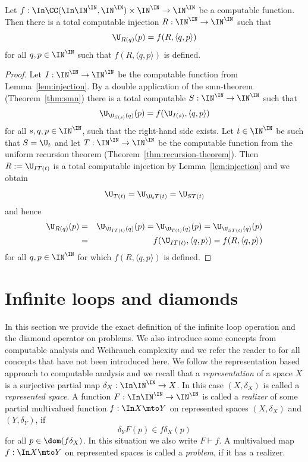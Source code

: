 \begin{thm}
\label{thm:injective-recursion}
Let $f:\In\CC(\In\IN^\IN,\IN^\IN)\times\IN^\IN\to\IN^\IN$ be a computable function.
Then there is a total computable injection $R:\IN^\IN\to\IN^\IN$ such that
\[\U_{R(q)}(p)=f(R,\langle q,p\rangle)\]
for all $q,p\in\IN^\IN$ such that $f(R,\langle q,p\rangle)$ is defined.
\end{thm}
\begin{proof}
Let $I:\IN^\IN\to\IN^\IN$ be the computable function from Lemma~\ref{lem:injection}.
By a double application of the smn-theorem (Theorem~\ref{thm:smn}) there is a total computable ${S:\IN^\IN\to\IN^\IN}$ such that
\[\U_{\U_{S(s)}(q)}(p)=f(\U_{I(s)},\langle q,p\rangle)\]
for all $s,q,p\in\IN^\IN$, such that the right-hand side exists. 
Let $t\in\IN^\IN$ be such that $S=\U_t$ and let $T:\IN^\IN\to\IN^\IN$ be the computable
function from the uniform recursion theorem (Theorem~\ref{thm:recursion-theorem}).
Then $R:=\U_{IT(t)}$ is a total computable injection by Lemma~\ref{lem:injection} and we obtain
\[\U_{T(t)}=\U_{\U_tT(t)}=\U_{ST(t)}\]
and hence
\begin{eqnarray*}
\U_{R(q)}(p) 
&=&\U_{\U_{IT(t)}(q)}(p)=\U_{\U_{T(t)}(q)}(p)=\U_{\U_{ST(t)}(q)}(p)\\
&=&f(\U_{IT(t)},\langle q,p\rangle)=f(R,\langle q,p\rangle)
\end{eqnarray*}
for all $q,p\in\IN^\IN$ for which $f(R,\langle q,p\rangle)$ is defined.
\end{proof}


\section{Infinite loops and diamonds}
\label{sec:definitions}

In this section we provide the exact definition of the infinite loop operation and the diamond operator on problems. 
We also introduce some concepts from computable analysis and Weihrauch complexity
and we refer the reader to \cite{BH21,Wei00} for all concepts that have not been introduced here.
We follow the representation based approach to computable analysis and we recall
that a {\em representation} of a space $X$ is a surjective partial map $\delta_X:\In\IN^\IN\to X$.
In this case $(X,\delta_X)$ is called a {\em represented space}.
A function $F:\In\IN^\IN\to\IN^\IN$
is called a {\em realizer} of some partial multivalued function $f:\In X\mto Y$ on represented spaces $(X,\delta_X)$ and $(Y,\delta_Y)$, if
\[\delta_YF(p)\in f\delta_X(p)\]
for all $p\in\dom(f\delta_X)$. In this situation we also write $F\vdash f$.
A multivalued map $f:\In X\mto Y$ on represented spaces is called a {\em problem}, if it has a realizer.

